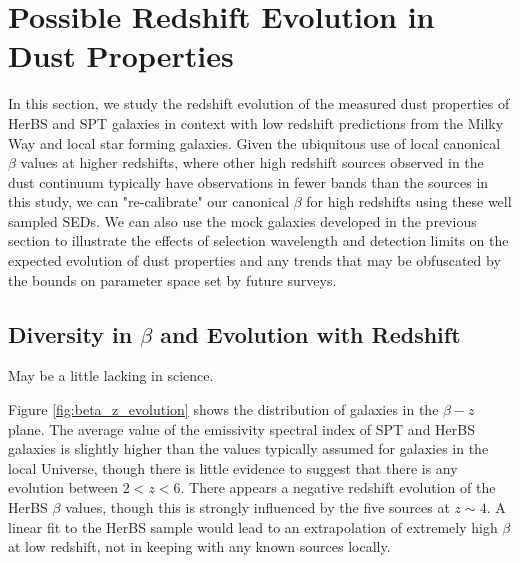 \section{Possible Redshift Evolution in Dust Properties}
\label{sec:redshift_evolution}

In this section, we study the redshift evolution of the measured dust properties of HerBS and SPT galaxies in context with low redshift predictions from the Milky Way and local star forming galaxies. Given the ubiquitous use of local canonical $\beta$ values at higher redshifts, where other high redshift sources observed in the dust continuum typically have observations in fewer bands than the sources in this study, we can "re-calibrate" our canonical $\beta$ for high redshifts using these well sampled SEDs. We can also use the mock galaxies developed in the previous section to illustrate the effects of selection wavelength and detection limits on the expected evolution of dust properties and any trends that may be obfuscated by the bounds on parameter space set by future surveys. 

\subsection{Diversity in $\beta$ and Evolution with Redshift}

{\color{red} May be a little lacking in science.}

Figure \ref{fig:beta_z_evolution} shows the distribution of galaxies in the $\beta-z$ plane. The average value of the emissivity spectral index of SPT and HerBS galaxies is slightly higher than the values typically assumed for galaxies in the local Universe, though there is little evidence to suggest that there is any evolution between $2 < z < 6$. There appears a negative redshift evolution of the HerBS $\beta$ values, though this is strongly influenced by the five sources at $z \sim 4$. A linear fit to the HerBS sample would lead to an extrapolation of extremely high $\beta$ at low redshift, not in keeping with any known sources locally.

